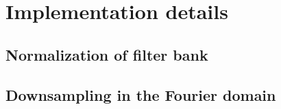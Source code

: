 \documentclass[twocolumn, openany, twoside, article]{memoir}
\begin{document}
\chapter{Implementation details}

\section{Normalization of filter bank}

\section{Downsampling in the Fourier domain}





\printbibliography
\end{document}
